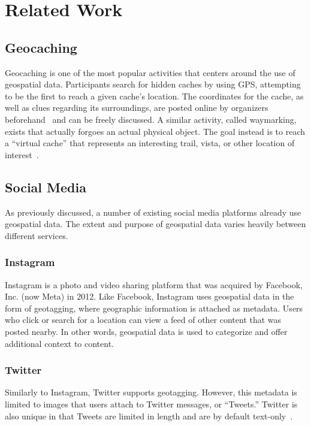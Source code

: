 \section{Related Work}

\subsection{Geocaching}

Geocaching is one of the most popular activities that centers around the use of geospatial data. Participants search for hidden caches by using \textsc{GPS}, attempting to be the first to reach a given cache's location. The coordinates for the cache, as well as clues regarding its surroundings, are posted online by organizers beforehand~\cite{natgeo_2017} and can be freely discussed. A similar activity, called waymarking, exists that actually forgoes an actual physical object. The goal instead is to reach a \enquote{virtual cache} that represents an interesting trail, vista, or other location of interest~\cite{natgeo_2017}.

\subsection{Social Media}

As previously discussed, a number of existing social media platforms already use geospatial data. The extent and purpose of geospatial data varies heavily between different services.

\subsubsection{Instagram}

Instagram is a photo and video sharing platform that was acquired by Facebook, Inc. (now Meta) in 2012. Like Facebook, Instagram uses geospatial data in the form of geotagging, where geographic information is attached as metadata. Users who click or search for a location can view a feed of other content that was posted nearby. In other words, geospatial data is used to categorize and offer additional context to content.

\subsubsection{Twitter}

Similarly to Instagram, Twitter supports geotagging. However, this metadata is limited to images that users attach to Twitter messages, or \enquote{Tweets.} Twitter is also unique in that Tweets are limited in length and are by default text-only~\cite{twitter_2022}.

